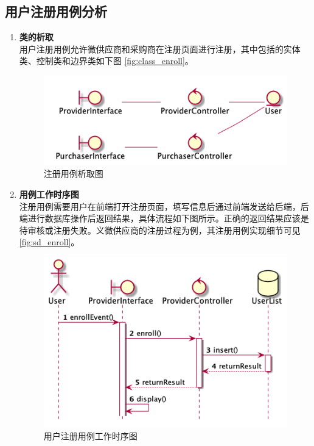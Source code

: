 	\subsection{用户注册用例分析} %
	\label{sub:用户注册用例分析}
	\begin{enumerate}
		\item \textbf{类的析取} \\
		用户注册用例允许微供应商和采购商在注册页面进行注册，其中包括的实体类、控制类和边界类如下图
		\autoref{fig:class_enroll}。
		\begin{figure}[htp]
		    \centering
		    \includegraphics[width=12cm]{report/figure/classAnalyse/enroll.png}
		    \caption{注册用例析取图}
		    \label{fig:class_enroll}
		\end{figure}

		\item \textbf{用例工作时序图} \\
		注册用例需要用户在前端打开注册页面，填写信息后通过前端发送给后端，后端进行数据库操作后返回结果，具体流程如下图所示。正确的返回结果应该是待审核或注册失败。义微供应商的注册过程为例，其注册用例实现细节可见\autoref{fig:sd_enroll}。

		\begin{figure}[htp]
		    \centering
		    \includegraphics[width=12cm]{report/figure/sequenceDiagram/sd_enroll.png}
		    \caption{用户注册用例工作时序图}
		    \label{fig:sd_enroll}
		\end{figure}

	\end{enumerate}

